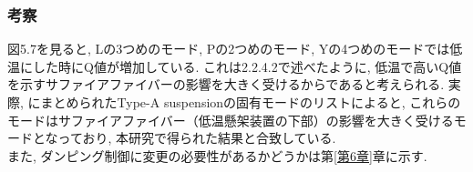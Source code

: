 \subsubsection{考察}
\vskip3mm
図5.7を見ると, Lの3つめのモード, Pの2つめのモード, Yの4つめのモードでは低温にした時にQ値が増加している.  これは2.2.4.2で述べたように, 低温で高いQ値を示すサファイアファイバーの影響を大きく受けるからであると考えられる. 実際, \cite{eigen}にまとめられたType-A suspensionの固有モードのリストによると, これらのモードはサファイアファイバー（低温懸架装置の下部）の影響を大きく受けるモードとなっており, 本研究で得られた結果と合致している.\\
\quad また, ダンピング制御に変更の必要性があるかどうかは第\ref{第6章}章に示す.
